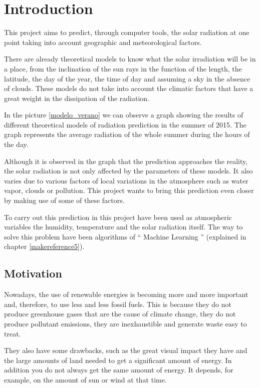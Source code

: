 \cleardoublepage

\chapter{Introduction}
\label{makereference2}

This project aims to predict, through computer tools, the solar radiation at one point taking into account geographic and meteorological factors.

There are already theoretical models to know what the solar irradiation will be in a place, from the inclination of the sun rays in the function of the length, the latitude, the day of the year, the time of day and assuming a sky in the absence of clouds. These models do not take into account the climatic factors that have a great weight in the dissipation of the radiation.

In the picture \ref{modelo_verano} we can observe a graph showing the results of different theoretical models of radiation prediction in the summer of 2015. The graph represents the average radiation of the whole summer during the hours of the day.

Although it is observed in the graph that the prediction approaches the reality, the solar radiation is not only affected by the parameters of these models. It also varies due to various factors of local variations in the atmosphere such as water vapor, clouds or pollution. This project wants to bring this prediction even closer by making use of some of these factors.

To carry out this prediction in this project have been used as atmospheric variables the humidity, temperature and the solar radiation itself. The way to solve this problem have been algorithms of `` Machine Learning '' (explained in chapter \ref{makereference5}).

\section{Motivation}
\label{makereference2.1}

Nowadays, the use of renewable energies is becoming more and more important and, therefore, to use less and less fossil fuels. This is because they do not produce greenhouse gases that are the cause of climate change, they do not produce pollutant emissions, they are inexhaustible and generate waste easy to treat.

They also have some drawbacks, such as the great visual impact they have and the large amounts of land needed to get a significant amount of energy. In addition you do not always get the same amount of energy. It depends, for example, on the amount of sun or wind at that time.

